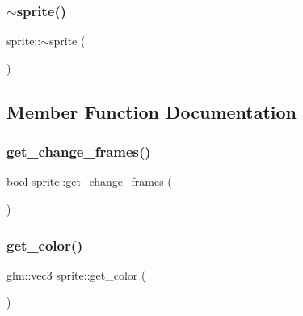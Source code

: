 \subsubsection{\texorpdfstring{$\sim$sprite()}{~sprite()}}
{\footnotesize\ttfamily sprite\+::$\sim$sprite (\begin{DoxyParamCaption}{ }\end{DoxyParamCaption})\hspace{0.3cm}{\ttfamily [inline]}}



\subsection{Member Function Documentation}
\mbox{\label{classsprite_a935dcb319f155f0fcb698e2c082e3f2c}} 
\subsubsection{\texorpdfstring{get\+\_\+change\+\_\+frames()}{get\_change\_frames()}}
{\footnotesize\ttfamily bool sprite\+::get\+\_\+change\+\_\+frames (\begin{DoxyParamCaption}{ }\end{DoxyParamCaption})\hspace{0.3cm}{\ttfamily [inline]}}

\mbox{\label{classsprite_a22a4f69358c9184a54173296d965db32}} 
\subsubsection{\texorpdfstring{get\+\_\+color()}{get\_color()}}
{\footnotesize\ttfamily glm\+::vec3 sprite\+::get\+\_\+color (\begin{DoxyParamCaption}{ }\end{DoxyParamCaption})\hspace{0.3cm}{\ttfamily [inline]}}

\mbox{\label{classsprite_abf33f325e9a1dc0b7b7ff6a26fca4ba4}} 
